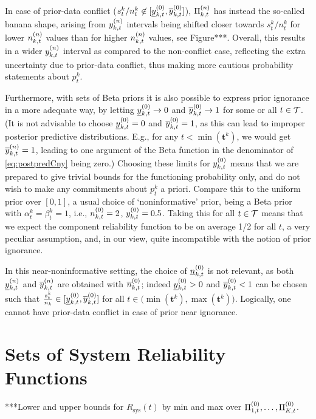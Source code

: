 \documentclass[authoryear, 12pt, a4paper]{elsarticle}
\newcommand{\bs}[1]{\boldsymbol{#1}}
\renewcommand{\vec}[1]{{\bs#1}}
\newcommand{\Rsys}{R_\text{sys}}
\newcommand{\td}[1]{%
  \iftoggle{td}{%
    \todo[inline]{#1}%
  }{}%
}
\begin{document}
In case of prior-data conflict ($s^k_t/n^k_t \not\in [\underline{y}^{(0)}_{k,t}, \overline{y}^{(0)}_{k,t}]$),
$\Pi^{(n)}_{k,t}$ has instead the so-called banana shape,
arising from $y^{(n)}_{k,t}$ intervals being shifted closer towards $s^k_t/n^k_t$
for lower $n^{(n)}_{k,t}$ values than for higher $n^{(n)}_{k,t}$ values, see Figure***.
Overall, this results in a wider $y^{(n)}_{k,t}$ interval as compared to the non-conflict case, 
reflecting the extra uncertainty due to prior-data conflict,
thus making more cautious probability statements about $p_t^k$.

Furthermore, with sets of Beta priors it is also possible
to express prior ignorance in a more adequate way,
by letting $\underline{y}^{(0)}_{k,t} \to 0$ and $\overline{y}^{(0)}_{k,t} \to 1$
for some or all $t \in {\cal T}$.
(It is not advisable to choose $\underline{y}^{(0)}_{k,t} = 0$ and $\overline{y}^{(0)}_{k,t} = 1$,
as this can lead to improper posterior predictive distributions.
E.g., for any $t < \min(\vec{t}^k)$,
we would get $\overline{y}^{(n)}_{k,t} = 1$, leading to one argument of the Beta function
in the denominator of \eqref{eq:postpredCny} being zero.)
Choosing these limits for $y^{(0)}_{k,t}$ means that we are prepared to give trivial bounds for the functioning probability only,
and do not wish to make any commitments about $p^k_t$ a priori.
Compare this to the uniform prior over $[0,1]$, a usual choice of `noninformative' prior,
being a Beta prior with $\alpha^k_t = \beta^k_t = 1$, i.e., $n^{(0)}_{k,t} = 2$, $y^{(0)}_{k,t} = 0.5$.
Taking this for all $t \in {\cal T}$ means that we expect the component reliability function
to be on average 1/2 for all $t$, a very peculiar assumption,
and, in our view, quite incompatible with the notion of prior ignorance.

In this near-noninformative setting, the choice of $\underline{n}^{(0)}_{k,t}$ is not relevant,
as both $\underline{y}^{(n)}_{k,t}$ and $\overline{y}^{(n)}_{k,t}$ are obtained with $\overline{n}^{(0)}_{k,t}$;
indeed $\underline{y}^{(0)}_{k,t} > 0$ and $\overline{y}^{(0)}_{k,t} < 1$ can be chosen such that
$\frac{s^k_t}{n_k} \in [\underline{y}^{(0)}_{k,t}, \overline{y}^{(0)}_{k,t}]$ for all $t \in \big(\min(\vec{t}^k), \max(\vec{t}^k)\big)$.
Logically, one cannot have prior-data conflict in case of prior near ignorance.

\td{***called near-noninformative, for near-noninformative sets when $\yz$ is not bounded see
benavoli zaffalon papers***}


\section{Sets of System Reliability Functions}

***Lower and upper bounds for $\Rsys(t)$ by min and max over $\Pi^{(0)}_{1,t}, \ldots, \Pi^{(0)}_{K,t}$.
\end{document}
